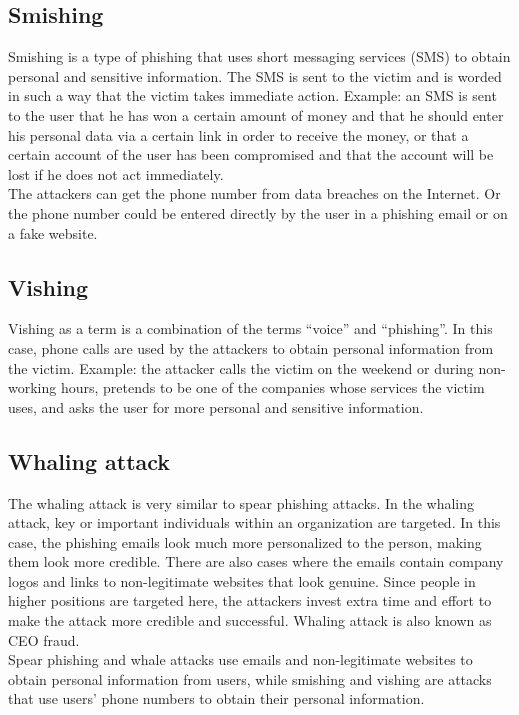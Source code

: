 \subsection{Smishing}
Smishing is a type of phishing that uses short messaging services (SMS) to obtain personal and sensitive information. The SMS is sent to the victim and is worded in such a way that the victim takes immediate action. Example: an SMS is sent to the user that he has won a certain amount of money and that he should enter his personal data via a certain link in order to receive the money, or that a certain account of the user has been compromised and that the account will be lost if he does not act immediately. \\
The attackers can get the phone number from data breaches on the Internet. Or the phone number could be entered directly by the user in a phishing email or on a fake website.


\subsection{Vishing}
Vishing as a term is a combination of the terms \enquote{voice} and \enquote{phishing}. In this case, phone calls are used by the attackers to obtain personal information from the victim. Example: the attacker calls the victim on the weekend or during non-working hours, pretends to be one of the companies whose services the victim uses, and asks the user for more personal and sensitive information.

\subsection{Whaling attack}
The whaling attack is very similar to spear phishing attacks. In the whaling attack, key or important individuals within an organization are targeted. In this case, the phishing emails look much more personalized to the person, making them look more credible. There are also cases where the emails contain company logos and links to non-legitimate websites that look genuine.
Since people in higher positions are targeted here, the attackers invest extra time and effort to make the attack more credible and successful.
Whaling attack is also known as CEO fraud. \\

Spear phishing and whale attacks use emails and non-legitimate websites to obtain personal information from users, while smishing and vishing are attacks that use users' phone numbers to obtain their personal information.